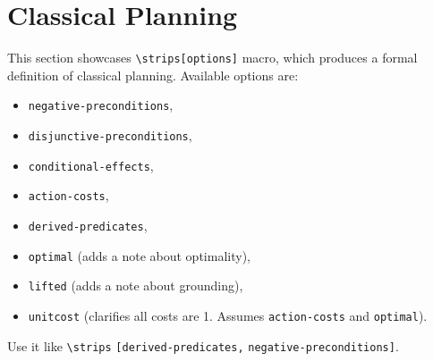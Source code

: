 %
%
%
%
%
%
%
%
%
%
%
%




\section{Classical Planning}
This section showcases \verb`\strips[options]` macro, which produces a formal definition of classical planning.
Available options are:
\begin{itemize}
 \item \texttt{negative-preconditions},
 \item \texttt{disjunctive-preconditions},
 \item \texttt{conditional-effects},
 \item \texttt{action-costs},
 \item \texttt{derived-predicates},
 \item \texttt{optimal} (adds a note about optimality),
 \item \texttt{lifted} (adds a note about grounding),
 \item \texttt{unitcost} (clarifies all costs are 1. Assumes \texttt{action-costs} and \texttt{optimal}).
\end{itemize}
Use it like \verb`\strips` \texttt{[derived-predicates,} \texttt{negative-preconditions]}.

